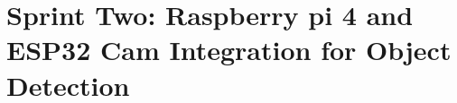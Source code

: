%
%



\chapter{Sprint Two: Raspberry pi 4 and ESP32 Cam Integration for Object Detection}



%




%